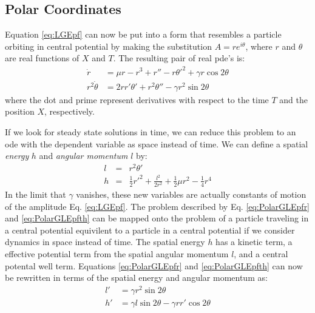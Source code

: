 \documentclass[api,pof,pre,12pt,a4paper]{revtex4-1}
\begin{document}
\subsection{Polar Coordinates}
Equation \ref{eq:LGEpf}  can now be put into a form that resembles a particle orbiting in central potential by making the substitution $A=r e^{i\theta}$, where $r$ and $\theta$ are real functions of $X$ and $T$.  The resulting pair of real pde's is:
\begin{subequations}
\begin{align}
\dot{r}&=\mu r - r^3 +r''-r\theta'^2+\gamma r \cos2\theta 
\label{eq:PolarGLEpfr} \\
r^2\dot{\theta}&=2 r r' \theta'+r^2\theta''-\gamma r^2 \sin 2\theta
\label{eq:PolarGLEpfth}
\end{align}
\end{subequations}
where the dot and prime represent derivatives with respect to the time $T$ and the position $X$, respectively.

If we look for steady state solutions in time, we can reduce this problem to an ode with the dependent variable as space instead of time.  We can define a spatial {\it energy} $h$ and {\it angular momentum} $l$ by:
\begin{eqnarray}
l &=& r^2\theta' \\
h &=& \frac{1}{2} r'^2 +\frac{l^2}{2r^2} +\frac{1}{2}\mu r^2 -\frac{1}{4} r^4
\end{eqnarray}
In the limit that $\gamma$ vanishes, these new variables are actually constants of motion of the amplitude Eq. \ref{eq:LGEpf}.  The problem described by Eq. \eqref{eq:PolarGLEpfr} and \eqref{eq:PolarGLEpfth} can be mapped onto the problem of a particle traveling in a central potential equivilent to a particle in a central potential if we consider dynamics in space instead of time.  The spatial energy $h$ has a kinetic term, a effective potential term from the spatial angular momentum $l$, and a central potental well term.  Equations \eqref{eq:PolarGLEpfr} and \eqref{eq:PolarGLEpfth} can now be rewritten in terms of the spatial energy and angular momentum as:
\begin{subequations}
\begin{align}
l' &= \gamma r^2 \sin 2\theta 
\label{eq:CentPotL} \\
h'&= \gamma l \sin 2\theta-\gamma r r' \cos 2\theta
\label{eq:CentPotH}
\end{align}
\end{subequations}
\end{document}
